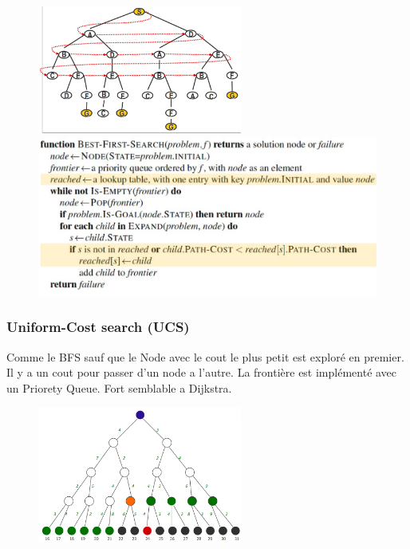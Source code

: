 			\begin{figure}[htp]
				\centering
				\includegraphics[width=0.6\textwidth]{img/BFS.png}
				\includegraphics[width=\textwidth]{img/CodeBFS.png}
			\end{figure}					
		\newpage
		\subsubsection{Uniform-Cost search (UCS)}
			Comme le BFS sauf que le Node avec le cout le plus petit est exploré en premier. Il y a un cout pour passer d'un node a l'autre. La frontière est implémenté avec un Priorety Queue. Fort semblable a Dijkstra.
			
			\begin{figure}[htp]
				\centering
				\includegraphics[width=0.6\textwidth]{img/UCS.png}
			\end{figure}
			
